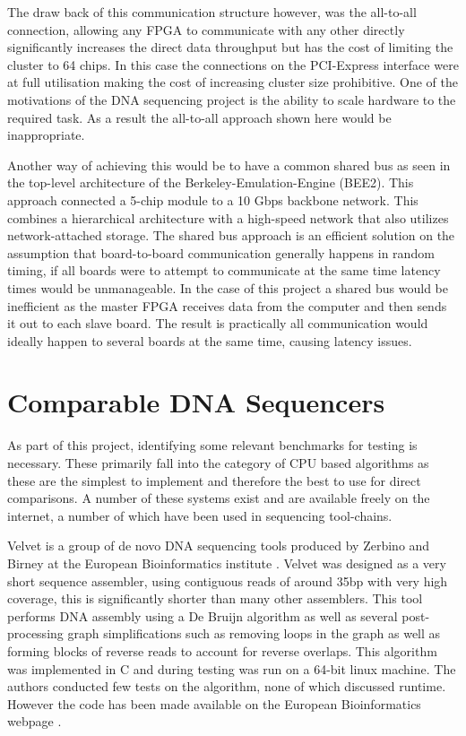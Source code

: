 The draw back of this communication structure however, was the all-to-all connection, allowing any FPGA to communicate with any other directly significantly increases the direct data throughput but has the cost of limiting the cluster to 64 chips. In this case the connections on the PCI-Express interface were at full utilisation making the cost of increasing cluster size prohibitive. One of the motivations of the DNA sequencing project is the ability to scale hardware to the required task. As a result the all-to-all approach shown here would be inappropriate. 


Another way of achieving this would be to have a common shared bus as seen in the top-level architecture of the Berkeley-Emulation-Engine (BEE2). This approach connected a 5-chip module to a 10 Gbps backbone network. This combines a hierarchical architecture with a high-speed network that also utilizes network-attached storage\cite{chang2005bee2}. The shared bus approach is an efficient solution on the assumption that board-to-board communication generally happens in random timing, if all boards were to attempt to communicate at the same time latency times would be unmanageable. In the case of this project a shared bus would be inefficient as the master FPGA receives data from the computer and then sends it out to each slave board. The result is practically all communication would ideally happen to several boards at the same time, causing latency issues. 

\section{Comparable DNA Sequencers}

As part of this project, identifying some relevant benchmarks for testing is necessary. These primarily fall into the category of CPU based algorithms as these are the simplest to implement and therefore the best to use for direct comparisons. A number of these systems exist and are available freely on the internet, a number of which have been used in sequencing tool-chains.

Velvet is a group of de novo DNA sequencing tools produced by Zerbino and Birney at the European Bioinformatics institute \cite{zerbino2008velvet}. Velvet was designed as a very short sequence assembler, using contiguous reads of around 35bp with very high coverage, this is significantly shorter than many other assemblers. This tool performs DNA assembly using a De Bruijn algorithm as well as several post-processing graph simplifications such as removing loops in the graph as well as forming blocks of reverse reads to account for reverse overlaps. This algorithm was implemented in C and during testing was run on a 64-bit linux machine. The authors conducted few tests on the algorithm, none of which discussed runtime. However the code has been made available on the European Bioinformatics webpage \cite{velvetdownload}.


